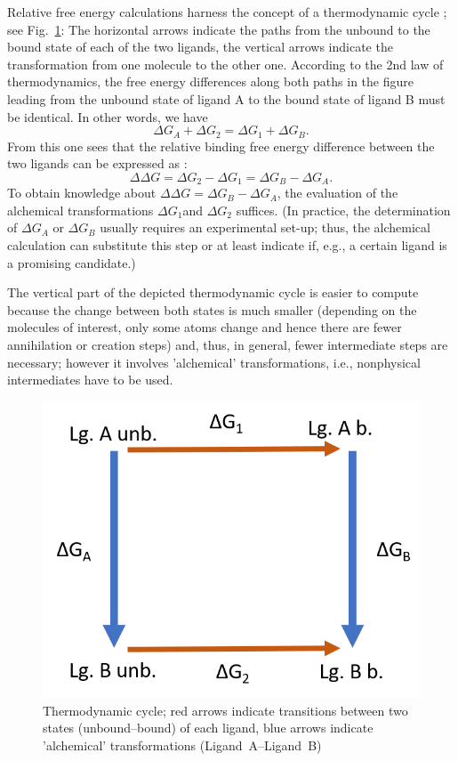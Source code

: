 Relative free energy calculations harness the concept of a thermodynamic
cycle \cite{Kollman.}; see Fig.~\ref{fig:cycle}: The horizontal arrows indicate the
paths from the unbound to the bound state of each of the two ligands,
the vertical arrows indicate the transformation from one molecule
to the other one. According to the 2nd law of thermodynamics, the free energy differences along both paths
in the figure leading from the unbound state of ligand A to the bound state
of ligand B must be identical. In other words, we have
\[
\Delta G_{A}+\Delta G_{2}=\Delta G_{1}+\Delta G_{B}.
\]
From this one sees that the relative binding free energy difference between the two ligands can be expressed as \cite{Cournia.2017}:
\[
\Delta\Delta G=\Delta G_{2}-\Delta G_{1}=\Delta G_{B}-\Delta G_{A}.
\]
To obtain knowledge about $\Delta\Delta G=\Delta G_{B}-\Delta G_{A}$,
the evaluation of the alchemical transformations $\Delta G_{1}$and
$\Delta G_{2}$ suffices. (In practice, the determination
of $\Delta G_{A}$ or $\Delta G_{B}$ usually requires an experimental
set-up; thus, the alchemical calculation can substitute this step
or at least indicate if, e.g., a certain ligand is a promising candidate.)

The vertical part of the depicted thermodynamic cycle is easier 
to compute because the change between both states is much smaller
(depending on the molecules of interest, only some atoms change and hence there are fewer annihilation or creation steps) and, thus, in general, fewer intermediate steps
are necessary; however it involves 'alchemical' transformations, i.e.,
nonphysical intermediates have to be used. 
\begin{figure}
\includegraphics[scale=0.8]{cycle1}\caption{Thermodynamic cycle; red arrows indicate transitions between two states
(unbound--bound) of each ligand, blue arrows indicate 'alchemical'
transformations (Ligand~A--Ligand~B)\label{fig:cycle}}

\end{figure}

